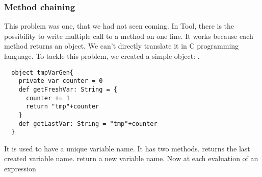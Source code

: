 \subsubsection{Method chaining}
This problem was one, that we had not seen coming.
\newline
In Tool, there is the possibility to write multiple call to a method on one line.
It works because each method returns an object. We can't directly translate it in C programming language.
To tackle this problem, we created a simple object: .
\begin{lstlisting}
  object tmpVarGen{
    private var counter = 0
    def getFreshVar: String = {
      counter += 1
      return "tmp"+counter
    }
    def getLastVar: String = "tmp"+counter
  }
\end{lstlisting}
It is used to have a unique variable name. It has two methods.
 returns the last created variable name.
 return a new variable name.
\newline
Now at each evaluation of an expression
